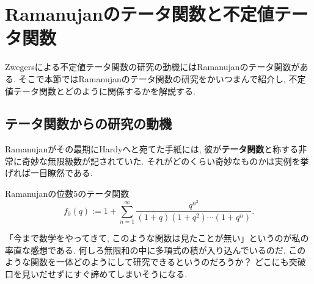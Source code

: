 \documentclass[11pt,b5paper,oneside,lualatex]{ltjsarticle} %
\numberwithin{equation}{section} %
\begin{document}

\section{Ramanujanのテータ関数と不定値テータ関数} \label{sec:mock}


Zwegersによる不定値テータ関数の研究の動機にはRamanujanのテータ関数がある. 
そこで本節ではRamanujanのテータ関数の研究をかいつまんで紹介し, 不定値テータ関数とどのように関係するかを解説する. 


\subsection{テータ関数からの研究の動機} \label{subsec:mock}


Ramanujanがその最期にHardyへと宛てた手紙には, 彼が\textbf{テータ関数}と称する非常に奇妙な無限級数が記されていた. 
それがどのくらい奇妙なものかは実例を挙げれば一目瞭然である. 

\begin{dfn}{Ramanujanの位数$ 5 $のテータ関数}{}
	\[
	f_0(q) :=
	1 + \sum_{n=1}^{\infty} \frac{q^{n^2}}{(1+q)(1+q^2) \cdots (1+q^n)}.
	\]
\end{dfn}

%

「今まで数学をやってきて, このような関数は見たことが無い」というのが私の率直な感想である. 
何しろ無限和の中に多項式の積が入り込んでいるのだ. 
このような関数を一体どのようにして研究できるというのだろうか？
どこにも突破口を見いだせずにすぐ諦めてしまいそうになる.
\end{document}

